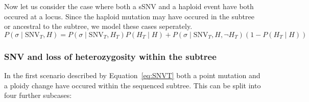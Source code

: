 \documentclass[../../main.tex]{subfiles}
\begin{document}
Now let us consider the case where both a sSNV and a haploid event have both occured at a locus. Since the haploid mutation may have occured in the subtree or ancestral to the subtree, we model these cases seperately.
\begin{equation}
P(\sigma\mid\text{SNV}_T,H) = P(\sigma\mid\text{SNV}_T,H_T)P(H_T\mid H) + P(\sigma\mid\text{SNV}_T,H,\neg H_T)(1-P(H_T\mid H)) \label{eq:SNVT}
\end{equation}
\subsubsection*{SNV and loss of heterozygosity within the subtree}
In the first scenario described by Equation~\eqref{eq:SNVT} both a point mutation and a ploidy change have occured within the sequenced subtree.
This can be split into four further subcases:
\end{document}
